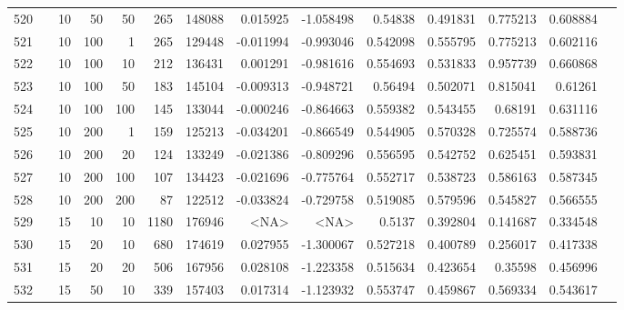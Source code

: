 \begin{longtable}{llrrrrrrrrrrrr}
		520 & &           10 &                50 &           50 &         265 &     148088 &  0.015925 & -1.058498 &   0.54838 &    0.491831 &       0.775213 &  0.608884 \\
		521 & &           10 &               100 &            1 &         265 &     129448 & -0.011994 & -0.993046 &  0.542098 &    0.555795 &       0.775213 &  0.602116 \\
		522 & &           10 &               100 &           10 &         212 &     136431 &  0.001291 & -0.981616 &  0.554693 &    0.531833 &       0.957739 &  0.660868 \\
		523 & &           10 &               100 &           50 &         183 &     145104 & -0.009313 & -0.948721 &   0.56494 &    0.502071 &       0.815041 &   0.61261 \\
		524 & &           10 &               100 &          100 &         145 &     133044 & -0.000246 & -0.864663 &  0.559382 &    0.543455 &        0.68191 &  0.631116 \\
		525 & &           10 &               200 &            1 &         159 &     125213 & -0.034201 & -0.866549 &  0.544905 &    0.570328 &       0.725574 &  0.588736 \\
		526 & &           10 &               200 &           20 &         124 &     133249 & -0.021386 & -0.809296 &  0.556595 &    0.542752 &       0.625451 &  0.593831 \\
		527 & &           10 &               200 &          100 &         107 &     134423 & -0.021696 & -0.775764 &  0.552717 &    0.538723 &       0.586163 &  0.587345 \\
		528 & &           10 &               200 &          200 &          87 &     122512 & -0.033824 & -0.729758 &  0.519085 &    0.579596 &       0.545827 &  0.566555 \\
		529 & &           15 &                10 &           10 &           1180 &     176946 &      <NA> &      <NA> &    0.5137 &    0.392804 &       0.141687 &  0.334548 \\
		530 & &           15 &                20 &           10 &         680 &     174619 &  0.027955 & -1.300067 &  0.527218 &    0.400789 &       0.256017 &  0.417338 \\
		531 & &           15 &                20 &           20 &         506 &     167956 &  0.028108 & -1.223358 &  0.515634 &    0.423654 &        0.35598 &  0.456996 \\
		532 & &           15 &                50 &           10 &         339 &     157403 &  0.017314 & -1.123932 &  0.553747 &    0.459867 &       0.569334 &  0.543617 \\

\end{longtable}
